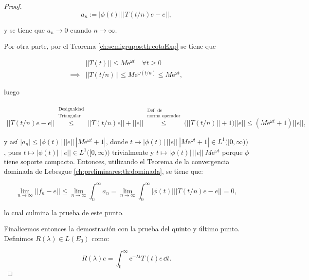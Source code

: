 \begin{proof}
    \[a_n := |\phi(t)| || T(t/n)e - e||,\]

    y se tiene que $a_n \rightarrow 0$ cuando $n \rightarrow \infty$.

    Por otra parte, por el Teorema \ref{ch:semigrupos:th:cotaExp} se tiene que

    \begin{align*}
        &||T(t)|| \leq M\mathrm{e}^{\omega t} \quad \forall t \geq 0\\
        \implies&||T(t/n)|| \leq M\mathrm{e}^{\omega (t/n)} \leq M\mathrm{e}^{\omega t},
    \end{align*}

    luego

    \begin{align*}
        ||T(t/n)e - e|| \overset{\substack{\text{Desigualdad} \\ \text{Triangular}}}{\leq} ||T(t/n)e|| + ||e|| \overset{\substack{\text{Def. de} \\ \text{norma operador}}}{\leq} \Big(||T(t/n)|| + 1 \Big )||e|| \leq (M\mathrm{e}^{\omega t} + 1)||e||,
    \end{align*}

    y así $|a_n| \leq |\phi(t)| \ ||e|| \ |M\mathrm{e}^{\omega t} + 1|$, donde $t \mapsto |\phi(t)| \ ||e|| \ |M\mathrm{e}^{\omega t} + 1| \in L^1\big([0, \infty)\big)$, pues $t \mapsto |\phi(t)| \ ||e|| \in L^1\big ([0, \infty) \big)$ trivialmente y $t \mapsto |\phi(t)| \ ||e|| \ M\mathrm{e}^{\omega t}$ porque $\phi$ tiene soporte compacto. Entonces, utilizando el Teorema de la convergencia dominada de Lebesgue \ref{ch:preliminares:th:dominada}, se tiene que:

    \[\lim_{n \rightarrow \infty }|| f_n - e || \leq \lim_{n \rightarrow \infty } \int_0 ^\infty a_n = \lim_{n \rightarrow \infty} \int_0^{\infty} |\phi(t)| || T(t/n)e - e|| = 0,\]

    lo cual culmina la prueba de este punto.

    Finalicemos entonces la demostración con la prueba del quinto y último punto. Definimos $R(\lambda) \in L(E_0)$ como:

    \[R(\lambda)e = \int_0^\infty \mathrm{e}^{-\lambda t}T(t)e \, \dd t.\]


\end{proof}
